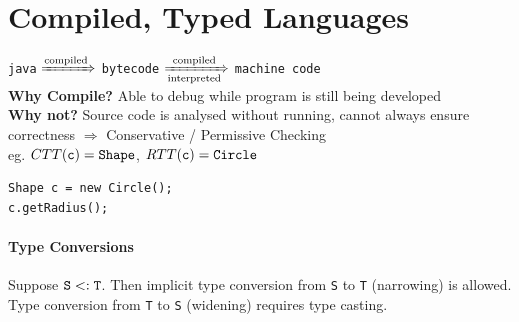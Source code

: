 \section{Compiled, Typed Languages}
\verb|java| $\xRightarrow{\text{compiled}}$ \verb|bytecode|
$\xRightarrow[\text{interpreted}]{\text{compiled}}$ \verb|machine code|\\
\textbf{Why Compile?} Able to debug while program is still
being developed\\
\textbf{Why not?} Source code is analysed
without running, cannot always ensure correctness $\Rightarrow$ Conservative /
Permissive Checking\\
\textcolor{OliveGreen}{eg.}
$CTT(\verb|c|)=\verb|Shape|$, $RTT(\verb|c|)=\verb|Circle|$
\begin{verbatim}
Shape c = new Circle();
c.getRadius();
\end{verbatim}
\paragraph{Type Conversions}
Suppose $\verb|S|<:\verb|T|$.
Then implicit type conversion from \verb|S| to \verb|T| (narrowing) is allowed.
Type conversion from \verb|T| to \verb|S| (widening) requires type casting.
